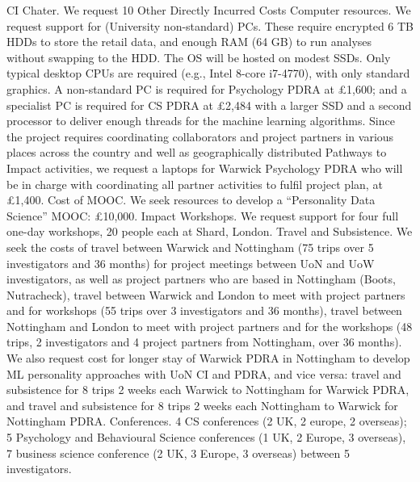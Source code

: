 CI Chater. We request 10%
Other Directly Incurred Costs
Computer resources. We request support for (University non-standard) PCs. These require encrypted 6 TB HDDs to store the retail data, and enough RAM (64 GB) to run analyses without swapping to the HDD. The OS will be hosted on modest SSDs. Only typical desktop CPUs are required (e.g., Intel 8-core i7-4770), with only standard graphics. A non-standard PC is required for Psychology PDRA at £1,600; and a specialist PC is required for CS PDRA at £2,484 with a larger SSD and a second processor to deliver enough threads for the machine learning algorithms. Since the project requires coordinating collaborators and project partners in various places across the country and well as geographically distributed Pathways to Impact activities, we request a laptops for Warwick Psychology PDRA who will be in charge with coordinating all partner activities to fulfil project plan, at £1,400. 
Cost of MOOC. We seek resources to develop a “Personality Data Science” MOOC: £10,000.  
Impact Workshops. We request support for four full one-day workshops, 20 people each at Shard, London.  
Travel and Subsistence. We seek the costs of travel between Warwick and Nottingham (75 trips over 5 investigators and 36 months) for project meetings between UoN and UoW investigators, as well as project partners who are based in Nottingham (Boots, Nutracheck), travel between Warwick and London to meet with project partners and for workshops (55 trips over 3 investigators and 36 months), travel between Nottingham and London to meet with project partners and for the workshops (48 trips, 2 investigators and 4 project partners from Nottingham, over 36 months). We also request cost for longer stay of Warwick PDRA in Nottingham to develop ML personality approaches with UoN CI and PDRA, and vice versa: travel and subsistence for 8 trips 2 weeks each Warwick to Nottingham for Warwick PDRA, and travel and subsistence for 8 trips 2 weeks each Nottingham to Warwick for Nottingham PDRA. 
Conferences. 4 CS conferences (2 UK, 2 europe, 2 overseas); 5 Psychology and Behavioural Science conferences (1 UK, 2 Europe, 3 overseas), 7 business science conference (2 UK, 3 Europe, 3 overseas) between 5 investigators. 



